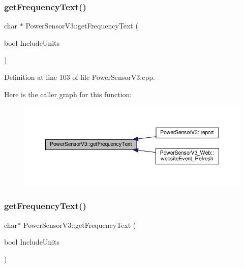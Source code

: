 \subsubsection{\texorpdfstring{get\+Frequency\+Text()}{getFrequencyText()}\hspace{0.1cm}{\footnotesize\ttfamily [1/2]}}
{\footnotesize\ttfamily char $\ast$ Power\+Sensor\+V3\+::get\+Frequency\+Text (\begin{DoxyParamCaption}\item[{bool}]{Include\+Units }\end{DoxyParamCaption})}



Definition at line 103 of file Power\+Sensor\+V3.\+cpp.

Here is the caller graph for this function\+:
\nopagebreak
\begin{figure}[H]
\begin{center}
\leavevmode
\includegraphics[width=350pt]{class_power_sensor_v3_adc5ce409d7bf0b6dac4d65fa64619bdb_icgraph}
\end{center}
\end{figure}
\mbox{\label{class_power_sensor_v3_aa3b90af786459745e6ec6d87d1ad80ad}} 
\subsubsection{\texorpdfstring{get\+Frequency\+Text()}{getFrequencyText()}\hspace{0.1cm}{\footnotesize\ttfamily [2/2]}}
{\footnotesize\ttfamily char$\ast$ Power\+Sensor\+V3\+::get\+Frequency\+Text (\begin{DoxyParamCaption}\item[{bool}]{Include\+Units }\end{DoxyParamCaption})}

\mbox{\label{class_power_sensor_v3_a0799057ba96ffc74b372b88d94874d33}} 
